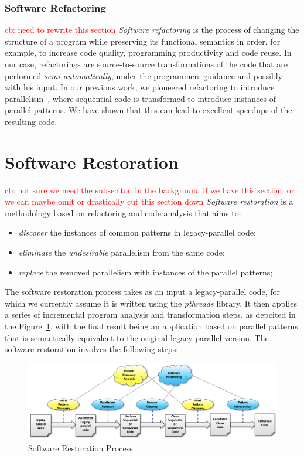 \subsubsection*{Software Refactoring}
\textcolor{red}{cb: need to rewrite this section}
\noindent
\emph{Software refactoring} is the process of changing the structure of a program while preserving
its functional semantics in order, for example, to increase code quality, programming
productivity and code reuse. In our case, refactorings are source-to-source transformations of the code that are performed \emph{semi-automatically}, under the programmers guidance and possibly with his input. In our previous work, we pioneered refactoring to introduce parallelism~\cite{rpl}, where sequential code is transformed to introduce instances of parallel patterns. We have shown that this can lead to excellent speedups of the resulting code.

\section{Software Restoration}
\textcolor{red}{cb: not sure we need the subseciton in the background if we have this section, or we can maybe omit or drastically cut this section down}
\noindent
\emph{Software restoration} is a methodology based on refactoring and code analysis that aims to:
\begin{itemize}
\item \emph{discover} the instances of common patterns in legacy-parallel code;
\item \emph{eliminate} the \emph{undesirable} parallelism from the same code;
\item \emph{replace} the removed parallelism with instances of the parallel patterns;
\end{itemize}
The software restoration process takes as an input a legacy-parallel code, for which we currently assume it is written using the \emph{pthreads} library. It then applies a series of incremental program analysis and transformation steps, as depcited in the Figure~\ref{fig:SoftRest}, with the final result being an application based on parallel patterns that is semantically equivalent to the original legacy-parallel version. The software restoration involves the following steps:

\begin{figure}
\centering
\includegraphics[width=\textwidth]{images/SoftRest.png}
\caption{Software Restoration Process}
\label{fig:SoftRest}
\end{figure}

